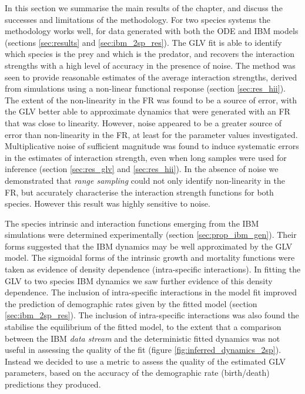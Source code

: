 In this section we summarise the main results of the chapter, and discuss the successes and limitations of the methodology. For two species systems the methodology works well, for data generated with both the ODE and IBM models (sections \ref{sec:results} and \ref{sec:ibm_2sp_res}). The GLV fit is able to identify which species is the prey and which is the predator, and recovers the interaction strengths with a high level of accuracy in the presence of noise. The method was seen to provide reasonable estimates of the average interaction strengths, derived from simulations using a non-linear functional response (section \ref{sec:res_hii}). The extent of the non-linearity in the FR was found to be a source of error, with the GLV better able to approximate dynamics that were generated with an FR that was close to linearity. However, noise appeared to be a greater source of error than non-linearity in the FR, at least for the parameter values investigated. Multiplicative noise of sufficient magnitude was found to induce systematic errors in the estimates of interaction strength, even when long samples were used for inference (section \ref{sec:res_glv} and \ref{sec:res_hii}).  In the absence of noise we demonstrated that \emph{range sampling} could not only identify non-linearity in the FR, but accurately characterise the interaction strength functions for both species. However this result was highly sensitive to noise. 

The species intrinsic and interaction functions emerging from the IBM simulations were determined experimentally (section \ref{sec:prop_ibm_gen}). Their forms suggested that the IBM dynamics may be well approximated by the GLV model. The sigmoidal forms of the intrinsic growth and mortality functions were taken as evidence of density dependence (intra-specific interactions). In fitting the GLV to two species IBM dynamics we saw further evidence of this density dependence. The inclusion of intra-specific interactions in the model fit improved the prediction of demographic rates given by the fitted model (section \ref{sec:ibm_2sp_res}). The inclusion of intra-specific interactions was also found the stabilise the equilibrium of the fitted model, to the extent that a comparison between the IBM \emph{data stream} and the deterministic fitted dynamics was not useful in assessing the quality of the fit (figure \ref{fig:inferred_dynamics_2sp}). Instead we decided to use a metric to assess the quality of the estimated GLV parameters, based on the accuracy of the demographic rate (birth/death) predictions they produced. 

